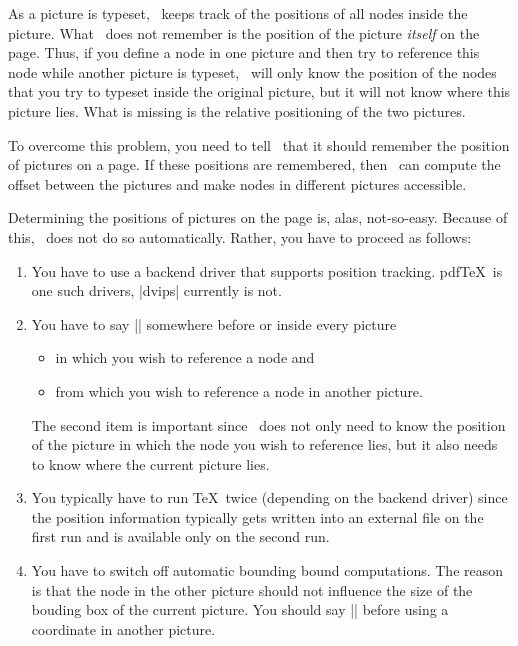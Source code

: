 As a picture is typeset, \pgfname\ keeps track of the positions of all
nodes inside the picture. What \pgfname\ does not remember is the
position of the picture \emph{itself} on the page. Thus, if you define
a node in one picture and then try to reference this node while
another picture is typeset, \pgfname\ will only know the position of
the nodes that you try to typeset inside the original picture, but it
will not know where this picture lies. What is missing is the relative
positioning of the two pictures.

To overcome this problem, you need to tell \pgfname\ that it should
remember the position of pictures on a page. If these positions are
remembered, then \pgfname\ can compute the offset between the pictures
and make nodes in different pictures accessible.

Determining the positions of pictures on the page is, alas,
not-so-easy. Because of this, \pgfname\ does not do so
automatically. Rather, you have to proceed as follows:
\begin{enumerate}
\item You have to use a backend driver that supports position
  tracking. pdf\TeX\ is one such drivers, |dvips| currently is not.
\item You have to say |\pgfrememberpicturepositiononpagetrue|
  somewhere before or inside every picture
  \begin{itemize}
  \item in which you wish to reference a node and
  \item from which you wish to reference a node in another picture.
  \end{itemize}
  The second item is important since \pgfname\ does not only need to
  know the position of the picture in which the node you wish to
  reference lies, but it also needs to know where the current picture
  lies.
\item You typically have to run \TeX\ twice (depending on the backend
  driver) since the position information typically gets written into
  an external file on the first run and is available only on the
  second run.
\item You have to switch off automatic bounding bound
  computations. The reason is that the node in the other picture
  should not influence the size of the bouding box of the current
  picture. You should say || before
  using a coordinate in another picture.
\end{enumerate}



